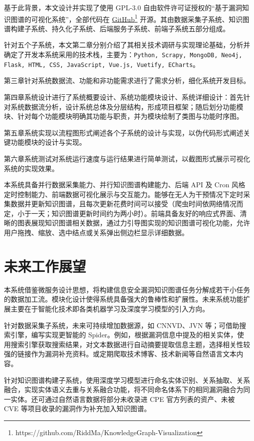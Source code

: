 \documentclass[a4paper,AutoFakeBold,oneside,12pt]{book}
\begin{document}
基于此背景，本文设计并实现了使用 GPL-3.0 自由软件许可证授权的``基于漏洞知识图谱的可视化系统''，全部代码在 \href{https://github.com/RiddMa/KnowledgeGraph-Visualization}{GitHub}\footnote{https://github.com/RiddMa/KnowledgeGraph-Visualization} 开源。其由数据采集子系统、知识图谱构建子系统、持久化子系统、后端服务子系统、前端子系统五部分组成。

针对五个子系统，本文第二章分别介绍了其相关技术调研与实现理论基础，分析并确定了开发本系统采用的技术栈，主要为：\lstinline|Python, Scrapy, MongoDB, Neo4j, Flask, HTML, CSS, JavaScript, Vue.js, Vuetify, ECharts|。

第三章针对系统数据流、功能和非功能需求进行了需求分析，细化系统开发目标。

第四章系统设计进行了系统概要设计、系统功能模块设计、系统详细设计：首先针对系统数据流分析，设计系统总体及分层结构，形成项目框架；随后划分功能模块、针对每个功能模块明确其功能与职责，并为模块绘制了类图与功能时序图。

第五章系统实现以流程图形式阐述各个子系统的设计与实现，以伪代码形式阐述关键功能模块的设计与实现。

第六章系统测试对系统运行速度与运行结果进行简单测试，以截图形式展示可视化系统的实现效果。

本系统具备并行数据采集能力、并行知识图谱构建能力、后端 API 及 Cron 风格定时控制能力、前端数据可视化展示与交互能力。能够在无人为干预情况下定时采集数据并更新知识图谱，且每次更新花费时间可以接受（爬虫时间依网络情况而定，小于一天；知识图谱更新时间约为两小时）。前端具备友好的响应式界面、清晰的图表展现知识图谱相关数据，通过力引导图实现的知识图谱可视化功能，允许用户拖拽、缩放、选中结点或关系弹出侧边栏显示详细数据。

\section{未来工作展望}

本系统借鉴微服务设计思想，将构建信息安全漏洞知识图谱任务分解成若干小任务的数据加工流。模块化设计使得系统具备强大的鲁棒性和扩展性。未来系统功能扩展主要在于智能化技术即各类机器学习及深度学习模型的引入方向。

针对数据采集子系统，未来可持续增加数据源，如 CNNVD、JVN 等；可借助搜索引擎，编写实现更智能的 Spider。例如，根据漏洞信息中提及的相关实体，使用搜索引擎获取搜索结果，对文本数据进行自动摘要提取信息主题，选择相关性较强的链接作为漏洞补充资料。或定期爬取技术博客、技术新闻等自然语言文本内容。

针对知识图谱构建子系统，使用深度学习模型进行命名实体识别、关系抽取、关系融合，实现实体语义去重与关系融合功能，将不同命名体系下的相同漏洞融合为同一实体。还可通过自然语言数据将部分未收录进 CPE 官方列表的资产、未被 CVE 等项目收录的漏洞作为补充加入知识图谱。
\end{document}
